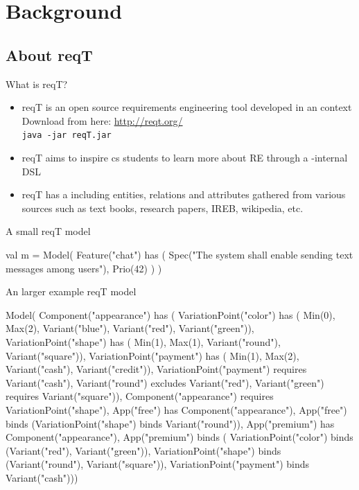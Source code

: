 \documentclass{slides}
\begin{document}
\section{Background}
\subsection{About reqT}
\begin{Slide}{What is reqT?}
\begin{itemize}
\item reqT is an open source requirements engineering tool developed in an  context\\ Download from here: \url{http://reqt.org/} \\ \texttt{java -jar reqT.jar}
\item reqT aims to inspire  cs students to learn more about RE through a -internal DSL
\item reqT has a  including entities, relations and attributes gathered from various sources such as text books, research papers, IREB, wikipedia, etc.
\end{itemize}
\end{Slide}

\begin{Slide}{A small reqT model}
\begin{Code}
val m = Model(
  Feature("chat") has (
    Spec("The system shall enable sending text messages among users"),
    Prio(42)
  )
)
\end{Code}
\end{Slide}

\begin{Slide}{An larger example reqT model}
\begin{Code}
Model(
  Component("appearance") has (
    VariationPoint("color") has (
      Min(0), Max(2), Variant("blue"), Variant("red"), Variant("green")),
    VariationPoint("shape") has (
      Min(1), Max(1), Variant("round"), Variant("square")),
    VariationPoint("payment") has (
      Min(1), Max(2), Variant("cash"), Variant("credit")),
    VariationPoint("payment") requires Variant("cash"), 
    Variant("round") excludes Variant("red"),
    Variant("green") requires Variant("square")),
  Component("appearance") requires VariationPoint("shape"), 
  App("free") has Component("appearance"),  
  App("free") binds (VariationPoint("shape") binds Variant("round")),
  App("premium") has Component("appearance"),  
  App("premium") binds ( 
    VariationPoint("color") binds (Variant("red"), Variant("green")),
    VariationPoint("shape") binds (Variant("round"), Variant("square")),
    VariationPoint("payment") binds Variant("cash")))
\end{Code}
\end{Slide}
\end{document}
